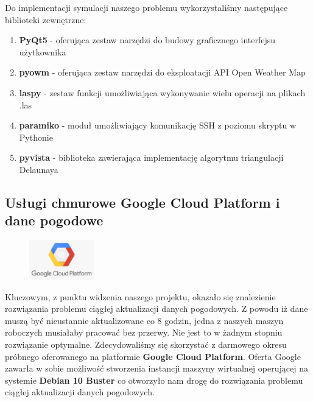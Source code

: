 Do implementacji symulacji naszego problemu wykorzystaliśmy następujące biblioteki zewnętrzne:

\begin{enumerate}
	\item \textbf{PyQt5} - oferująca zestaw narzędzi do budowy graficznego interfejsu użytkownika
	\item \textbf{pyowm} - oferująca zestaw narzędzi do eksploatacji API Open Weather Map
	\item \textbf{laspy} - zestaw funkcji umożliwiająca wykonywanie wielu operacji na plikach .las
	\item \textbf{paramiko} - moduł umożliwiający komunikację SSH z poziomu skryptu w Pythonie
	\item \textbf{pyvista} - biblioteka zawierająca implementację algorytmu triangulacji Delaunaya
\end{enumerate}

\subsection{Usługi chmurowe Google Cloud Platform i dane pogodowe}
\begingroup
\begin{figure}
	
	\centering
	\includegraphics[width=0.25\textwidth]{gcp_logo.png}
	
\end{figure}
Kluczowym, z punktu widzenia naszego projektu, okazało się znalezienie rozwiązania problemu ciągłej aktualizacji danych pogodowych. Z powodu iż dane muszą być nieustannie aktualizowane co 8 godzin, jedna z naszych maszyn roboczych musiałaby pracować bez przerwy. Nie jest to w żadnym stopniu rozwiązanie optymalne. Zdecydowaliśmy się skorzystać z darmowego okresu próbnego oferowanego na platformie \textbf{Google Cloud Platform}. Oferta Google zawarła w sobie możliwość stworzenia instancji maszyny wirtualnej operującej na systemie \textbf{Debian 10 Buster} co otworzyło nam drogę do rozwiązania problemu ciągłej aktualizacji danych pogodowych.
\clearpage

